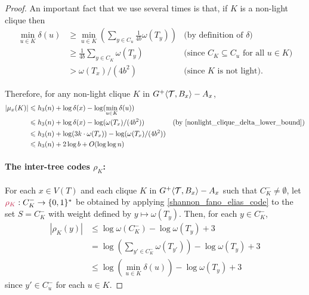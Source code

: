 \begin{proof}
  An important fact that we use several times is that, if $K$ is a non-light clique then 
  \begin{align}
    \min_{u\in K} \delta(u) 
    & \ge \min_{u\in K}\left(\sum_{y\in C_u}\tfrac{1}{4b}\omega(T_y) \right) 
    & \text{(by definition of $\delta$)} \nonumber \\
    & \ge \tfrac{1}{4b}\sum_{y\in C_K} \omega(T_y)  
    & \text{(since $C_K\subseteq C_u$ for all $u\in K$)} \nonumber \\
    & > \omega(T_x)/(4b^2) 
    & \text{(since $K$ is not light).} \label{nonlight_clique_delta_lower_bound}
  \end{align}

  Therefore, for any non-light clique $K$ in ${G^+}\langle{\mathcal{T},B_x}\rangle-A_x$,  
  \begin{align}
    |\mu_x(K)|
    & \le h_3(n) + \log\delta(x)-\log(\min_{u\in K} \delta(u)) \nonumber \\
    & \le h_3(n) + \log\delta(x)-\log(\omega(T_x)/(4b^2)) & \text{(by \eqref{nonlight_clique_delta_lower_bound})} \nonumber \\
    & \le h_3(n) + \log(3k\cdot\omega(T_x))-\log(\omega(T_x)/(4b^2)) \nonumber \\
    & \le h_3(n) + 2\log b  + \Oh(\log\log n)
      \label{mu_x_K_light_upper_bound}
  \end{align}

  \paragraph{\boldmath The inter-tree codes $\rho_K$:}

  For each $x\in V(T)$ and each clique $K$ in ${G^+}\langle{\mathcal{T},B_x}\rangle-A_x$ such that $C^-_K\neq\emptyset$, let $\mathdefin{\rho_K}:C^-_K\to\{0,1\}^*$ be obtained by applying \cref{shannon_fano_elias_code} to the set $S=C^-_K$ with weight defined by $y\mapsto\omega(T_y)$.  Then, for each $y\in C^-_K$, 
  \begin{align}
    |\rho_K(y)|
      & \le \log\omega(C^-_K) - \log\omega(T_y) + 3 \nonumber \\
      & = \textstyle\log\left(\sum_{y'\in C^-_K}\omega(T_{y'})\right) - \log\omega(T_y) + 3 \nonumber \\
      & \le \log(\min_{u\in K}\delta(u)) - \log\omega(T_y) + 3
      \label{rho_K_y_upper_bound}
  \end{align}
  since $y'\in C^-_u$ for each $u\in K$.


\end{proof}
